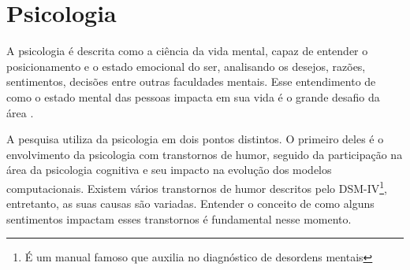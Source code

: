 \section{Psicologia}

A psicologia é descrita como a ciência da vida mental, capaz de entender o posicionamento e o estado emocional do ser, analisando os desejos, razões, sentimentos, decisões entre outras faculdades mentais. Esse entendimento de como o estado mental das pessoas impacta em sua vida é o grande desafio da área \cite[4-8]{william1890principles}.

A pesquisa utiliza da psicologia em dois pontos distintos. O primeiro deles é o envolvimento da psicologia com transtornos de humor, seguido da participação na área da psicologia cognitiva e seu impacto na evolução dos modelos computacionais. Existem vários transtornos de humor descritos pelo DSM-IV\footnote{É um manual famoso que auxilia no diagnóstico de desordens mentais\cite{dsmiv}}, entretanto, as suas causas são variadas. Entender o conceito de como alguns sentimentos impactam esses transtornos é fundamental nesse momento.



